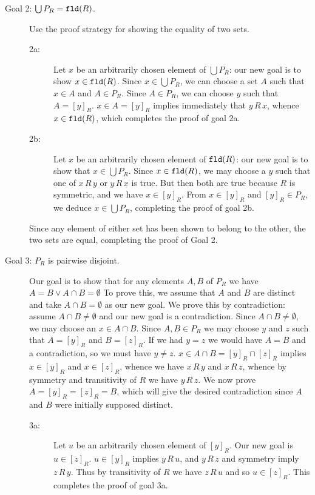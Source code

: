 \documentclass[12pt]{book}
\begin{document}
\begin{description}
\begin{description}
\item[Goal 2: $\bigcup P_R = {\tt fld}(R)$.]  Use the proof strategy for
showing the equality of two sets.  

\begin{description}
\item[2a:] Let $x$ be an arbitrarily chosen element of $\bigcup P_R$:
our new goal is to show $x \in {\tt fld}(R)$.  Since $x \in \bigcup
P_R$, we can choose a set $A$ such that $x \in A$ and $A \in P_R$.
Since $A \in P_R$, we can choose $y$ such that $A = [y]_R$.  $x \in A
= [y]_R$ implies immediately that $y \,R\,x$, whence $x \in {\tt
fld}(R)$, which completes the proof of goal 2a.

\item[2b:] Let $x$ be an arbitrarily chosen element of ${\tt fld}(R)$:
our new goal is to show that $x \in \bigcup P_R$.  Since $x \in {\tt
fld}(R)$, we may choose a $y$ such that one of $x \,R\,y$ or $y\,R\,x$
is true.  But then both are true because $R$ is symmetric, and we have
$x \in [y]_R$.  From $x \in [y]_R$ and $[y]_R \in P_R$, we deduce $x
\in \bigcup P_R$, completing the proof of goal 2b.

\end{description}

Since any element of either set has been shown to belong to the other,
the two sets are equal, completing the proof of Goal 2.

\item[Goal 3: $P_R$ is pairwise disjoint.]  Our goal is to show that
for any elements $A,B$ of $P_R$ we have $A=B \vee A \cap B =
\emptyset$ To prove this, we assume that $A$ and $B$ are distinct and
take $A \cap B = \emptyset$ as our new goal.  We prove this by
contradiction: assume $A \cap B \neq \emptyset$ and our new goal is a
contradiction.  Since $A \cap B \neq \emptyset$, we may choose an $x
\in A \cap B$.  Since $A, B \in P_R$ we may choose $y$ and $z$ such
that $A = [y]_R$ and $B = [z]_R$.  If we had $y=z$ we would have $A=B$
and a contradiction, so we must have $y \neq z$.  $x \in A \cap B =
[y]_R \cap [z]_R$ implies $x \in [y]_R$ and $x \in [z]_R$, whence we
have $x\,R\,y$ and $x\,R\,z$, whence by symmetry and transitivity of
$R$ we have $y\,R\,z$.  We now prove $A = [y]_R = [z]_R = B$, which
will give the desired contradiction since $A$ and $B$ were initially
supposed distinct.

\begin{description}
\item[3a:] Let $u$ be an arbitrarily chosen element of $[y]_R$.  Our
new goal is $u \in [z]_R$.  $u \in [y]_R$ implies $y\,R\,u$, and
$y\,R\,z$ and symmetry imply $z \,R\,y$.  Thus by transitivity of $R$
we have $z\,R\,u$ and so $u \in [z]_R$.  This completes the proof of
goal 3a.


\end{description}
\end{description}
\end{description}
\end{document}
